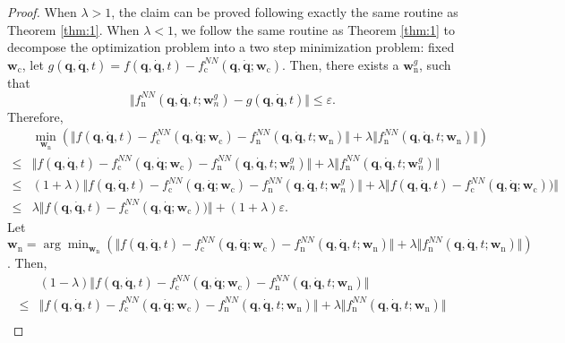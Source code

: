 \documentclass[aps,pre,reprint,superscriptaddress,nofootinbib,amsmath,amssymb]{revtex4-2}
\newcommand{\mat}[1]{\mathbf{#1}}
\newcommand{\q}{\mat{q}}
\newcommand{\qd}{\dot{\mat{q}}}
\begin{document}
\begin{proof}
	When $\lambda>1$, the claim can be proved following exactly the same routine as Theorem \ref{thm:1}. When $\lambda<1$, we follow the same routine as Theorem \ref{thm:1} to decompose the optimization problem into a two step minimization problem: fixed $\boldsymbol{w}_{\mathrm{c}}$, let $g(\q,\qd,t)=f(\q,\qd,t)-f_{\mathrm{c}}^{NN}(\q,\qd;\boldsymbol{w}_{\mathrm{c}})$. Then, there exists a $\boldsymbol{w}_{\mathrm{n}}^g$, such that 
	\begin{equation*}
		\Vert f_{\mathrm{n}}^{NN}(\q,\qd,t;\boldsymbol{w}^g_n)-g(\q,\qd,t)\Vert\le \varepsilon.
	\end{equation*}
	Therefore, 
	\begin{align*}
		&\min_{\boldsymbol{w}_{\mathrm{n}}}\left( \Vert f(\q,\qd,t)-f_{\mathrm{c}}^{NN}(\q,\qd;\boldsymbol{w}_{\mathrm{c}})-f_{\mathrm{n}}^{NN}(\q,\qd,t;\boldsymbol{w}_{\mathrm{n}})\Vert +\lambda \Vert f_{\mathrm{n}}^{NN}(\q,\qd,t;\boldsymbol{w}_{\mathrm{n}})\Vert\right)
		\\
		\le&\Vert f(\q,\qd,t)-f_{\mathrm{c}}^{NN}(\q,\qd;\boldsymbol{w}_{\mathrm{c}})-f_{\mathrm{n}}^{NN}(\q,\qd,t;\boldsymbol{w}^g_n)\Vert+\lambda \Vert f_{\mathrm{n}}^{NN}(\q,\qd,t;\boldsymbol{w}^g_n)\Vert
		\\
		\le&(1+\lambda)\Vert f(\q,\qd,t)-f_{\mathrm{c}}^{NN}(\q,\qd;\boldsymbol{w}_{\mathrm{c}})-f_{\mathrm{n}}^{NN}(\q,\qd,t;\boldsymbol{w}^g_n)\Vert  +\lambda \Vert f(\q,\qd,t)-f_{\mathrm{c}}^{NN}(\q,\qd;\boldsymbol{w}_{\mathrm{c}})  )\Vert
		\\
		\le& \lambda \Vert f(\q,\qd,t)-f_{\mathrm{c}}^{NN}(\q,\qd;\boldsymbol{w}_{\mathrm{c}})  )\Vert+(1+\lambda)\varepsilon.
	\end{align*}
	Let $\boldsymbol{w}_{\mathrm{n}}=\arg\min_{\boldsymbol{w}_{\mathrm{n}}}\left( \Vert f(\q,\qd,t)-f_{\mathrm{c}}^{NN}(\q,\qd;\boldsymbol{w}_{\mathrm{c}})-f_{\mathrm{n}}^{NN}(\q,\qd,t;\boldsymbol{w}_{\mathrm{n}})\Vert +\lambda \Vert f_{\mathrm{n}}^{NN}(\q,\qd,t;\boldsymbol{w}_{\mathrm{n}})\Vert\right)$. Then,
	\begin{align}
		\nonumber
		&(1-\lambda)\Vert f(\q,\qd,t)-f_{\mathrm{c}}^{NN}(\q,\qd;\boldsymbol{w}_{\mathrm{c}})-f_{\mathrm{n}}^{NN}(\q,\qd,t;\boldsymbol{w}_{\mathrm{n}})\Vert
		\\
		\nonumber
		\le&\Vert f(\q,\qd,t)-f_{\mathrm{c}}^{NN}(\q,\qd;\boldsymbol{w}_{\mathrm{c}})-f_{\mathrm{n}}^{NN}(\q,\qd,t;\boldsymbol{w}_{\mathrm{n}})\Vert +\lambda \Vert f_{\mathrm{n}}^{NN}(\q,\qd,t;\boldsymbol{w}_{\mathrm{n}})\Vert
		\\

\end{align}
\end{proof}
\end{document}
